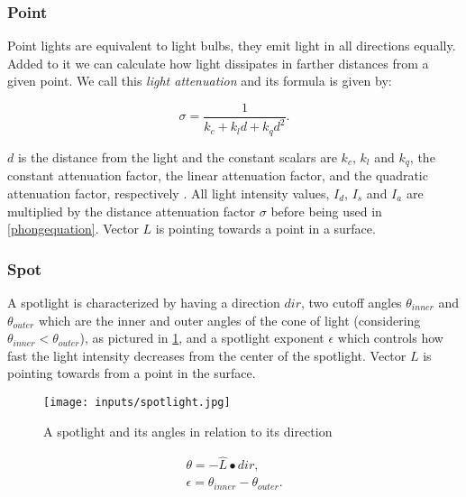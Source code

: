 \documentclass[cic,tc,english]{iiufrgs}
\begin{document}
\subsubsection{Point}
Point lights are equivalent to light bulbs, they emit light in all directions equally. Added to it we can calculate how light dissipates in farther distances from a given point. We call this \textit{light attenuation} and its formula is given by:

\begin{equation}
    \sigma = \frac{1}{k_c + k_l d  + k_q d^2}.
    \label{lightattenuation}
\end{equation}

$d$ is the distance from the light and the constant scalars are $k_c$, $k_l$ and $k_q$, the constant attenuation factor, the linear attenuation factor, and the quadratic attenuation factor, respectively \cite{Buss2003computergraphicsmathematical}. All light intensity values, $I_d$,  $I_s$ and  $I_a$ are multiplied by the distance attenuation factor $\sigma$ before being used in \cref{phongequation}. Vector $L$ is pointing towards a point in a surface.

\subsubsection{Spot}
A spotlight is characterized by having a direction $dir$, two cutoff angles $\theta_{inner}$ and $\theta_{outer}$ which are the inner and outer angles of the cone of light (considering $\theta_{inner} < \theta_{outer}$), as pictured in \cref{spotlight}, and a spotlight exponent $\epsilon$ which controls how fast the light intensity decreases from the center of the spotlight. Vector $L$ is pointing towards from a point in the surface.

\begin{figure}[hbt!]
    \caption{A spotlight and its angles in relation to its direction}
    \begin{center}
        \texttt{[image: inputs/spotlight.jpg]}
    \end{center}
    \label{spotlight}
\end{figure}


\begin{equation}
    \begin{array}{lc}
        \theta = - \hat L \bullet dir,              \\
        \epsilon = \theta_{inner} - \theta_{outer}.
    \end{array}
\end{equation}
\end{document}
